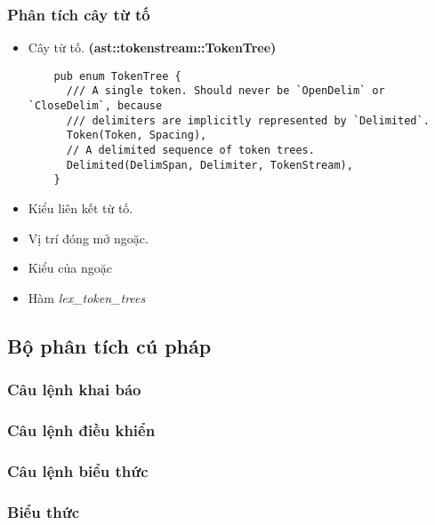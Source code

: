 {\subsubsection{Phân tích cây từ tố}
\begin{itemize}
  \item \label{ap1:tokentree}Cây từ tố. \textbf{(ast::tokenstream::TokenTree)}
  \begin{lstlisting}
    pub enum TokenTree {
      /// A single token. Should never be `OpenDelim` or `CloseDelim`, because
      /// delimiters are implicitly represented by `Delimited`.
      Token(Token, Spacing),
      // A delimited sequence of token trees.
      Delimited(DelimSpan, Delimiter, TokenStream),
    }
  \end{lstlisting}
  \item Kiểu liên kết từ tố.
  \item Vị trí đóng mở ngoặc.
  \item Kiểu của ngoặc
  \item Hàm \textit{lex\_token\_trees}
\end{itemize}

\subsection{Bộ phân tích cú pháp}
\subsubsection{Câu lệnh khai báo}
\label{ap1:decl}
\subsubsection{Câu lệnh điều khiển}
\subsubsection{Câu lệnh biểu thức}
\subsubsection{Biểu thức}

}